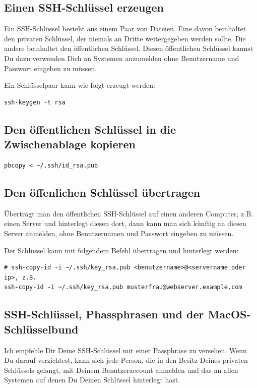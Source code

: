 \documentclass[]{article}
\begin{document}
\subsection{Einen SSH-Schlüssel erzeugen}
Ein SSH-Schlüssel besteht aus einem Paar von Dateien. Eine davon beinhaltet den privaten Schlüssel, der niemals an Dritte weitergegeben werden sollte. Die andere beinhaltet den öffentlichen Schlüssel. Diesen öffentlichen Schlüssel kannst Du dazu verwenden Dich an Systemen anzumelden ohne Benutzername und Passwort eingeben zu müssen.

Ein Schlüsselpaar kann wie folgt erzeugt werden:
\begin{verbatim}
ssh-keygen -t rsa
\end{verbatim}

\subsection{Den öffentlichen Schlüssel in die Zwischenablage kopieren}
\begin{verbatim}
pbcopy < ~/.ssh/id_rsa.pub
\end{verbatim}

\subsection{Den öffenlichen Schlüssel übertragen}
Überträgt man den öffentlichen SSH-Schlüssel auf einen anderen Computer, z.B. einen Server und hinterlegt diesen dort, dann kann man sich künftig an diesen Server anmelden, ohne Benutzernamen und Passwort eingeben zu müssen.

Der Schlüssel kann mit folgendem Befehl übertragen und hinterlegt werden:
\begin{verbatim}
# ssh-copy-id -i ~/.ssh/key_rsa.pub <benutzername>@<servername oder ip>, z.B.
ssh-copy-id -i ~/.ssh/key_rsa.pub musterfrau@webserver.example.com
\end{verbatim}

\subsection{SSH-Schlüssel, Phassphrasen und der MacOS-Schlüsselbund}
Ich empfehle Dir Deine SSH-Schlüssel mit einer Passphrase zu versehen. Wenn Du darauf verzichtest, kann sich jede Person, die in den Besitz Deines privaten Schlüssels gelangt, mit Deinem Benutzeraccount anmelden und das an allen Systemen auf denen Du Deinen Schlüssel hinterlegt hast.
\end{document}
